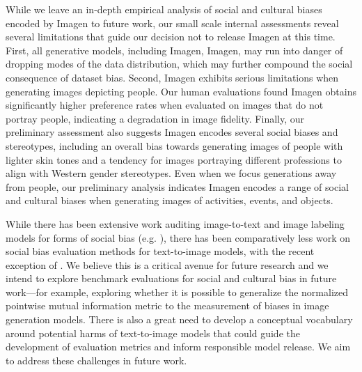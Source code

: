  While we leave an in-depth empirical analysis of social and cultural biases encoded by Imagen to future work, our small scale internal assessments reveal several limitations that guide our decision not to release Imagen at this time. First, all generative models, including Imagen, Imagen, may run into danger of dropping modes of the data distribution, which may further compound the social consequence of dataset bias. Second, Imagen exhibits serious limitations when generating images depicting people. Our human evaluations found Imagen obtains significantly higher preference rates when evaluated on images that do not portray people, indicating  a degradation in image fidelity. Finally, our preliminary assessment also suggests Imagen  encodes several social biases and stereotypes, including an overall bias towards generating images of people with lighter skin tones and a tendency for images portraying different professions to align with Western gender stereotypes. Even when we focus generations away from people, our preliminary analysis indicates Imagen encodes a range of social and cultural biases when generating images of activities, events, and objects. 

While there has been extensive work auditing image-to-text and image labeling models for forms of social bias (e.g. \cite{gendershades, Burns2018, Steed2021}), there has been comparatively less work on social bias evaluation methods for text-to-image models, with the recent exception of \citep{dalleval}. We believe this is a critical avenue for future research and we intend to explore benchmark evaluations for social and cultural bias in future work---for example, exploring whether it is possible to generalize the normalized pointwise mutual information metric \cite{npmi} to the measurement of biases in image generation models. There is also a great need to develop a conceptual vocabulary around potential harms of text-to-image models that could guide the development of evaluation metrics and inform responsible model release.  We aim to address these challenges in future work.


